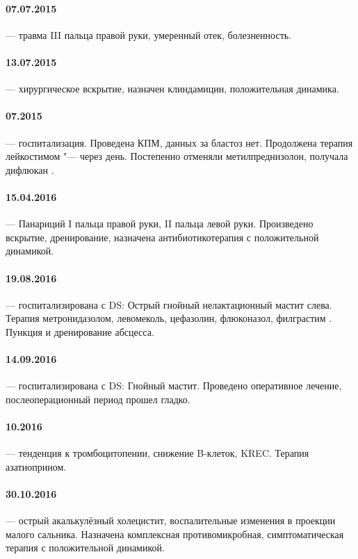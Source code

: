 \documentclass[a4paper,14pt]{extarticle}
\newcommand{\mug}{мкг}
\newcommand{\mgpd}{мг/сут.}
\newcommand{\mugpd}{мкг/сут.}
\newcommand{\mugpkg}{мкг/кг}
\begin{document}
\paragraph{07.07.2015} --- травма III пальца правой руки, умеренный отек, болезненность.

\paragraph{13.07.2015} --- хирургическое вскрытие, назначен клиндамицин, положительная динамика.

\paragraph{07.2015} --- госпитализация. Проведена КПМ, данных за бластоз нет. Продолжена терапия лейкостимом \numprint[\mugpkg]{5} "--- \numprint[\mug]{150} через день. Постепенно отменяли метилпреднизолон, получала дифлюкан \numprint[\mgpd]{100}.

\paragraph{15.04.2016} --- Панариций I пальца правой руки, II пальца левой руки. Произведено вскрытие, дренирование, назначена антибиотикотерапия с положительной динамикой.

\paragraph{19.08.2016} --- госпитализирована с DS: Острый гнойный нелактационный мастит слева. Терапия метронидазолом, левомеколь, цефазолин, флюконазол, филграстим \numprint[\mugpd]{150}. Пункция и дренирование абсцесса.

\paragraph{14.09.2016} --- госпитализирована с DS: Гнойный мастит. Проведено оперативное лечение, послеоперационный период прошел гладко.

\paragraph{10.2016} --- тенденция к тромбоцитопении, снижение B-клеток, KREC. Терапия азатиоприном.

\paragraph{30.10.2016} --- острый акалькулёзный холецистит, воспалительные изменения в проекции малого сальника. Назначена комплексная противомикробная, симптоматическая терапия с положительной динамикой.
\end{document}

